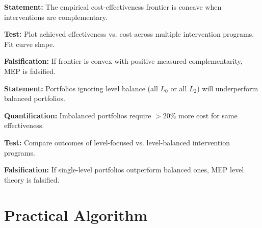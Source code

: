 \begin{tcolorbox}[colback=green!5!white, colframe=green!75!black,
    title=Prediction MEP-P3: Frontier Concavity]
\textbf{Statement:} The empirical cost-effectiveness frontier is concave when
interventions are complementary.

\textbf{Test:} Plot achieved effectiveness vs. cost across multiple intervention
programs. Fit curve shape.

\textbf{Falsification:} If frontier is convex with positive measured complementarity,
MEP is falsified.
\end{tcolorbox}

\begin{tcolorbox}[colback=green!5!white, colframe=green!75!black,
    title=Prediction MEP-P4: Level-Balance Premium]
\textbf{Statement:} Portfolios ignoring level balance (all $L_0$ or all $L_2$) will
underperform balanced portfolios.

\textbf{Quantification:} Imbalanced portfolios require $>20\%$ more cost for
same effectiveness.

\textbf{Test:} Compare outcomes of level-focused vs. level-balanced intervention
programs.

\textbf{Falsification:} If single-level portfolios outperform balanced ones, MEP
level theory is falsified.
\end{tcolorbox}


\section{Practical Algorithm}
\label{sec:mep-algorithm}

